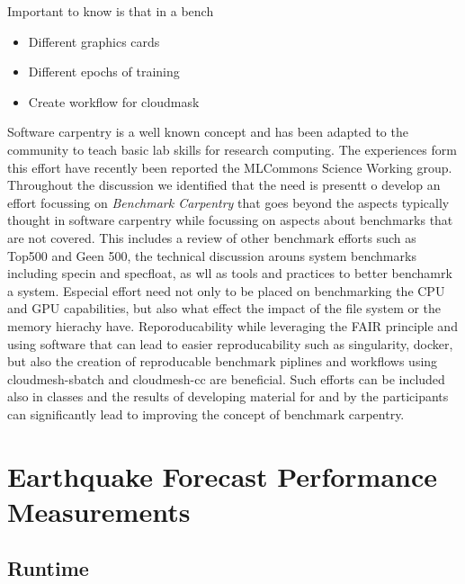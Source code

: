 \documentclass[utf8]{FrontiersinVancouver} %
\begin{document}
Important to know is that in a bench

\begin{itemize}
\item Different graphics cards

\item Different epochs of training

\item Create workflow for cloudmask
\end{itemize}




Software carpentry \citep{software-carpentry} is a well known concept
and has been adapted to the community to teach basic lab skills for
research computing.  The experiences form this effort have recently
been reported the MLCommons Science Working group. Throughout the
discussion we identified that the need is presentt o develop an effort
focussing on {\em Benchmark Carpentry} that goes beyond the aspects
typically thought in software carpentry while focussing on aspects
about benchmarks that are not covered. This includes a review of other
benchmark efforts such as Top500 and Geen 500, the technical
discussion arouns system benchmarks including specin and specfloat, as
wll as tools and practices to better benchamrk a system. Especial
effort need not only to be placed on benchmarking the CPU and GPU
capabilities, but also what effect the impact of the file system or
the memory hierachy have. Reporoducability while leveraging the FAIR
principle and using software that can lead to easier reproducability
such as singularity, docker, but also the creation of reproducable
benchmark piplines and workflows using cloudmesh-sbatch and
cloudmesh-cc are beneficial. Such efforts can be included also in
classes and the results of developing material for and by the
participants can significantly lead to improving the concept of
benchmark carpentry.


\section{Earthquake Forecast Performance Measurements}
\label{sec:perf-main}


\subsection{Runtime}

\label{sec:perf-runtime}
\end{document}

